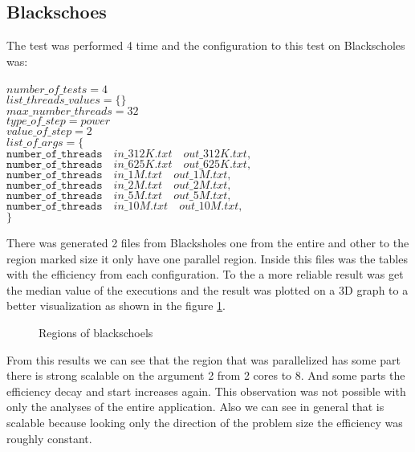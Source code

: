 \documentclass[sigconf]{acmart}
\begin{document}
\subsection{Blackschoes}
The test was performed 4 time and the configuration to this test on Blackscholes was:
\\
\\
$number\_of\_tests=4$\\
$list\_threads\_values=\{\}$\\
$max\_number\_threads=32$\\
$type\_of\_step=power$\\
$value\_of\_step=2$\\
$list\_of\_args=\{$\\
$\texttt{number\_of\_threads} \quad in\_312K.txt \quad out\_312K.txt,$\\
$\texttt{number\_of\_threads} \quad in\_625K.txt \quad out\_625K.txt,$\\
$\texttt{number\_of\_threads} \quad in\_1M.txt \quad out\_1M.txt,$\\
$\texttt{number\_of\_threads} \quad in\_2M.txt \quad out\_2M.txt,$\\
$\texttt{number\_of\_threads} \quad in\_5M.txt \quad out\_5M.txt,$\\
$\texttt{number\_of\_threads} \quad in\_10M.txt \quad out\_10M.txt,$\\
$\}$

There was generated 2 files from Blacksholes one from the entire and other to the region marked size it only have one parallel region. Inside this files was the tables with the efficiency from each configuration. To the a more reliable result was get the median value of the executions and the result was plotted on a 3D graph to a better visualization as shown in the figure \ref{fig:blackRegions}.


\begin{figure}[H]
     \centering
     
     
     \caption{Regions of blackschoels}
     \label{fig:blackRegions}
\end{figure}

From this results we can see that the region that was parallelized has some part there is strong scalable on the argument 2 from 2 cores to 8.
And some parts the efficiency decay and start increases again. This observation was not possible with only the analyses of the entire application. Also we can see in general that is scalable because looking only the direction of the problem size the efficiency was roughly constant.
\end{document}
